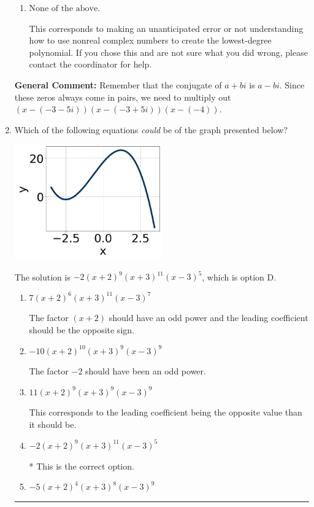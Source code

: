 \documentclass{extbook}[14pt]
\newcommand{\litem}[1]{\item #1

\rule{\textwidth}{0.4pt}}
\begin{document}
\begin{enumerate}
{\begin{enumerate}[label=\Alph*.]
* $x^{3} +10 x^{2} +58 x + 136$, which is the correct option.
\item \( \text{None of the above.} \)

This corresponds to making an unanticipated error or not understanding how to use nonreal complex numbers to create the lowest-degree polynomial. If you chose this and are not sure what you did wrong, please contact the coordinator for help.
\end{enumerate}

\textbf{General Comment:} Remember that the conjugate of $a+bi$ is $a-bi$. Since these zeros always come in pairs, we need to multiply out $(x-(-3 - 5 i))(x-(-3 + 5 i))(x-(-4))$.
}
\litem{
Which of the following equations \textit{could} be of the graph presented below?

\begin{center}
    \includegraphics[width=0.5\textwidth]{../Figures/polyGraphToFunctionCopyC.png}
\end{center}


The solution is \( -2(x + 2)^{9} (x + 3)^{11} (x - 3)^{5} \), which is option D.\begin{enumerate}[label=\Alph*.]
\item \( 7(x + 2)^{6} (x + 3)^{11} (x - 3)^{7} \)

The factor $(x + 2)$ should have an odd power and the leading coefficient should be the opposite sign.
\item \( -10(x + 2)^{10} (x + 3)^{9} (x - 3)^{9} \)

The factor $-2$ should have been an odd power.
\item \( 11(x + 2)^{9} (x + 3)^{9} (x - 3)^{9} \)

This corresponds to the leading coefficient being the opposite value than it should be.
\item \( -2(x + 2)^{9} (x + 3)^{11} (x - 3)^{5} \)

* This is the correct option.
\item \( -5(x + 2)^{4} (x + 3)^{8} (x - 3)^{9} \)


\end{enumerate}}
\end{enumerate}
\end{document}

